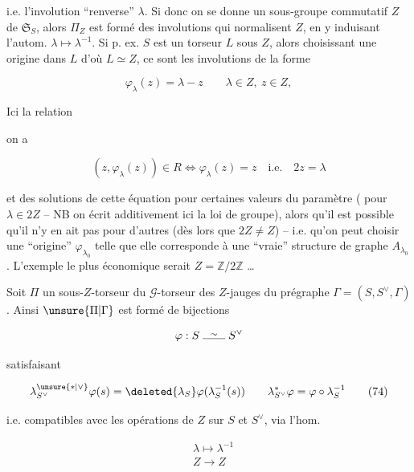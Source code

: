 i.e. l'involution ``renverse'' $\lambda$. Si donc on se donne un sous-groupe commutatif $Z$ de $\mathfrak S_S$, alors $\Pi_Z$ est formé des involutions  qui  normalisent $Z$, en y induisant l'autom.  $\lambda\longmapsto\lambda^{-1}$. Si p. ex. $S$ est  un torseur $L$ sous $Z$,    alors choisissant une origine dans $L$ d'où $L\simeq Z$, ce sont les involutions de la forme

\[
\varphi_\lambda(z)=\lambda-z\qquad \lambda\in Z,\ z\in Z,
\]

Ici la relation 

on a

\[
(z,\varphi_\lambda(z))\in R\iff\varphi_\lambda(z)=z\quad\text{i.e.}\quad2z=\lambda \tag*{(73)}
\]

et   des solutions  de cette équation pour certaines valeurs du paramètre (  pour $\lambda\in2Z$ -- NB on écrit additivement ici la loi de groupe), alors qu'il est possible qu'il n'y en ait pas pour d'autres (dès lors que $2Z\ne Z$) -- i.e. qu'on peut  choisir une ``origine'' $\varphi_{\lambda_0}$ telle que elle  corresponde à une ``vraie'' structure de graphe $A_{\lambda_0}$. L'exemple le plus économique serait  $Z=\mathbb Z/2\mathbb Z$ \unsure{,} \ldots

Soit $\Pi$ un sous-$Z$-torseur du $\mathcal G$-torseur des $Z$-jauges du prégraphe $\Gamma=(S,S^\vee,\Gamma)$. Ainsi $\unsure{\Pi|\Gamma}$ est formé de bijections

\[
\varphi:S\mathrel{\overset{\sim}{\rule{2em}{0.35pt}}} S^\vee
\]

satisfaisant

\[
\lambda_{S^\vee}^{\unsure{*|\vee}}\varphi(s)=\deleted{\lambda_S}\varphi(\lambda_S^{-1}(s))
\qquad \lambda_{S^\vee}^{*}\varphi=\varphi\circ\lambda_S^{-1} \tag*{(74)}
\]

i.e. compatibles avec les opérations de $Z$ sur $S$ et $S^\vee$, via l'hom.

\[
\begin{aligned}
&\lambda\longmapsto\lambda^{-1}\\
&Z\longrightarrow Z
\end{aligned} \tag*{(75)}
\]

